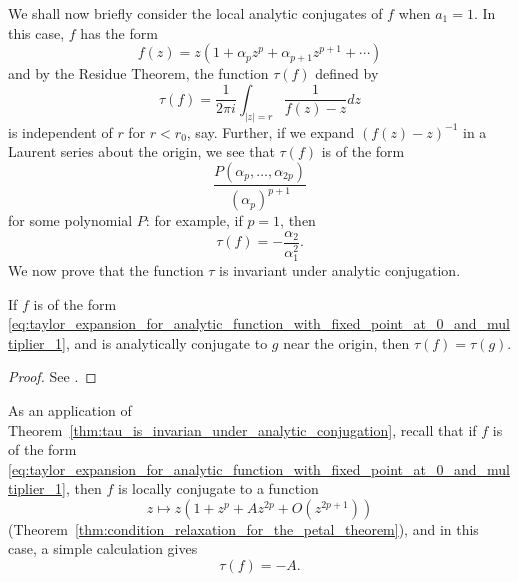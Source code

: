 We shall now briefly consider the local analytic conjugates of $f$ when $a_1 =
1$. In this case, $f$ has the form
\begin{equation}
    \label{eq:taylor_expansion_for_analytic_function_with_fixed_point_at_0_and_multiplier_1}
    f(z) = z(1 + \alpha_p z^p + \alpha_{p+1} z^{p+1} + \cdots)
\end{equation}
and by the Residue Theorem, the function $\tau(f)$ defined by
\begin{equation*}
    \tau(f) = \frac{1}{2\pi i} \int_{|z|=r} \frac{1}{f(z) - z} d z
\end{equation*}
is independent of $r$ for $r < r_0$, say. Further, if we expand $(f(z) -
z)^{-1}$ in a Laurent series about the origin, we see that $\tau(f)$ is of the
form
\begin{equation*}
    \frac{P(\alpha_p, \dots, \alpha_{2p})}{(\alpha_p)^{p+1}}
\end{equation*}
for some polynomial $P$: for example, if $p = 1$, then
\begin{equation*}
    \tau(f) = -\frac{\alpha_2}{\alpha_1^2}.
\end{equation*}
We now prove that the function $\tau$ is invariant under analytic conjugation.

\begin{theorem}
    \label{thm:tau_is_invarian_under_analytic_conjugation}
    If $f$ is of the form
    \eqref{eq:taylor_expansion_for_analytic_function_with_fixed_point_at_0_and_multiplier_1},
    and is analytically conjugate to $g$ near the origin, then $\tau(f) =
    \tau(g)$.
\end{theorem}
\begin{proof}
    See \cite[153--154]{Beardon1991}.
\end{proof}

As an application of
Theorem~\ref{thm:tau_is_invarian_under_analytic_conjugation}, recall that if $f$
is of the form
\eqref{eq:taylor_expansion_for_analytic_function_with_fixed_point_at_0_and_multiplier_1},
then $f$ is locally conjugate to a function
\begin{equation}
    \label{eq:taylor_expansion_for_conjugate_of_analytic_function_with_fixed_point_at_0_and_multiplier_1}
    z \mapsto z(1 + z^p + Az^{2p} + O(z^{2p+1}))
\end{equation}
(Theorem~\ref{thm:condition_relaxation_for_the_petal_theorem}), and in this
case, a simple calculation gives
\begin{equation*}
    \tau(f) = -A.
\end{equation*}

